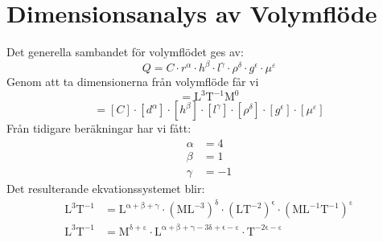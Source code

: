 \documentclass[a4paper,12pt]{article}
\begin{document}
\section{Dimensionsanalys av Volymflöde}
Det generella sambandet för volymflödet ges av:
\begin{equation}
    Q = C \cdot r^\alpha \cdot h^\beta \cdot l^\gamma \cdot \rho^\delta \cdot g^\epsilon \cdot \mu^\varepsilon
    \label{eq:general_flow}
\end{equation}
%
%
Genom att ta dimensionerna från volymflöde får vi
\begin{equation}
    [Q] = \mathrm{L^3T^{-1}M^0}
    \label{eq:dim_Q}
\end{equation}
%
\begin{equation}
    [Q] = [C] \cdot [d^\alpha] \cdot [h^\beta] \cdot [l^\gamma] \cdot [\rho^\delta] \cdot [g^\epsilon] \cdot [\mu^\varepsilon]
    \label{eq:dim_analysis}
\end{equation}
%
Från tidigare beräkningar har vi fått:
\begin{align}
    \alpha &= 4 \label{eq:alpha} \\
    \beta &= 1 \label{eq:beta} \\
    \gamma &= -1 \label{eq:gamma}
\end{align}
%
Det resulterande ekvationssystemet blir:
\begin{align}
    \mathrm{L^3T^{-1}} &= \mathrm{L^{\alpha + \beta + \gamma}} \cdot 
    \mathrm{(ML^{-3})^\delta} \cdot \mathrm{(LT^{-2})^\epsilon} \cdot 
    \mathrm{(ML^{-1}T^{-1})^\varepsilon} \\
    \mathrm{L^3T^{-1}} &= \mathrm{M^{\delta + \varepsilon}} \cdot 
    \mathrm{L^{\alpha + \beta + \gamma - 3\delta + \epsilon - \varepsilon}} \cdot 
    \mathrm{T^{-2\epsilon - \varepsilon}}
\end{align}
\end{document}
